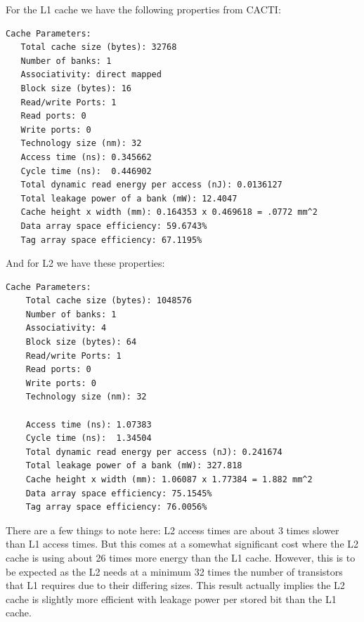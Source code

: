\documentclass[a4paper, 11pt]{exam}
\begin{document}
\begin{enumerate}
\begin{enumerate}
\begin{enumerate}
For the L1 cache we have the following properties from CACTI:
\begin{verbatim}
Cache Parameters:
   Total cache size (bytes): 32768
   Number of banks: 1
   Associativity: direct mapped
   Block size (bytes): 16
   Read/write Ports: 1
   Read ports: 0
   Write ports: 0
   Technology size (nm): 32
   Access time (ns): 0.345662
   Cycle time (ns):  0.446902
   Total dynamic read energy per access (nJ): 0.0136127
   Total leakage power of a bank (mW): 12.4047
   Cache height x width (mm): 0.164353 x 0.469618 = .0772 mm^2
   Data array space efficiency: 59.6743%
   Tag array space efficiency: 67.1195%
\end{verbatim}
And for L2 we have these properties:
\begin{verbatim}
Cache Parameters:
    Total cache size (bytes): 1048576
    Number of banks: 1
    Associativity: 4
    Block size (bytes): 64
    Read/write Ports: 1
    Read ports: 0
    Write ports: 0
    Technology size (nm): 32

    Access time (ns): 1.07383
    Cycle time (ns):  1.34504
    Total dynamic read energy per access (nJ): 0.241674
    Total leakage power of a bank (mW): 327.818
    Cache height x width (mm): 1.06087 x 1.77384 = 1.882 mm^2
    Data array space efficiency: 75.1545%
    Tag array space efficiency: 76.0056%
\end{verbatim}
There are a few things to note here: L2 access times are about 3 times slower
than L1 access times. But this comes at a somewhat significant cost where the
L2 cache is using about 26 times more energy than the L1 cache. However, this is
to be expected as the L2 needs at a minimum 32 times the number of
transistors that L1 requires due to their differing sizes. This result actually
implies the L2 cache is slightly more efficient with leakage power per stored
bit than the L1 cache.


\end{enumerate}
\end{enumerate}
\end{enumerate}
\end{document}
